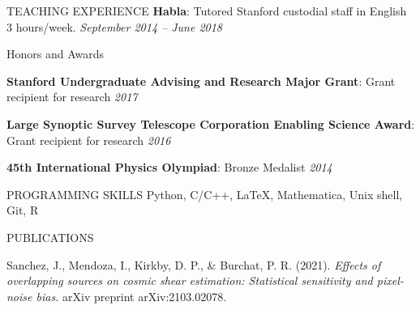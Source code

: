 \begin{rSection}{TEACHING EXPERIENCE}
\vspace*{-.15cm}
\textbf{Habla}: Tutored Stanford custodial staff in English 3 hours/week. \hfill {\em September 2014 -- June 2018}
\end{rSection}


\begin{rSection}{Honors and Awards} \itemsep -3pt \vspace*{-.25cm}
\item \textbf{Stanford Undergraduate Advising and Research Major Grant}: Grant recipient for research \hfill {\em 2017}

\item \textbf{Large Synoptic Survey Telescope Corporation Enabling Science Award}: Grant recipient for research \hfill {\em 2016}

\item \textbf{45th International Physics Olympiad}:  Bronze Medalist \hfill {\em 2014}
\end{rSection}
\begin{rSection}{PROGRAMMING SKILLS}
%
Python, C/C++, \LaTeX, Mathematica, Unix shell, Git, R
\end{rSection}


\begin{rSection}{PUBLICATIONS}
%
\vspace*{-1em}
\item Sanchez, J., Mendoza, I., Kirkby, D. P., \& Burchat, P. R. (2021). \textit{Effects of overlapping sources on cosmic shear estimation: Statistical sensitivity and pixel-noise bias.} arXiv preprint arXiv:2103.02078.
\end{rSection}

